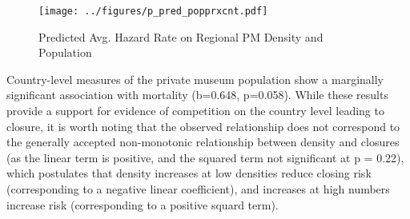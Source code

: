 \documentclass[12pt]{article}
\begin{document}
\begin{figure}[htbp]
\centering
\texttt{[image: ../figures/p\_pred\_popprxcnt.pdf]}
\caption{\label{fig:p_pred_popprxcnt}Predicted Avg. Hazard Rate on Regional PM Density and Population}
\end{figure}




Country-level measures of the private museum population show a marginally significant association with mortality (b=0.648, p=0.058).
While these results provide a support for evidence of competition on the country level leading to closure, it is worth noting that the observed relationship does not correspond to the generally accepted non-monotonic relationship between density and closures (as the linear term is positive, and the squared term not significant at p = 0.22), which postulates that density increases at low densities reduce closing risk (corresponding to a negative linear coefficient), and increases at high numbers increase risk (corresponding to a positive squard term).
\end{document}
